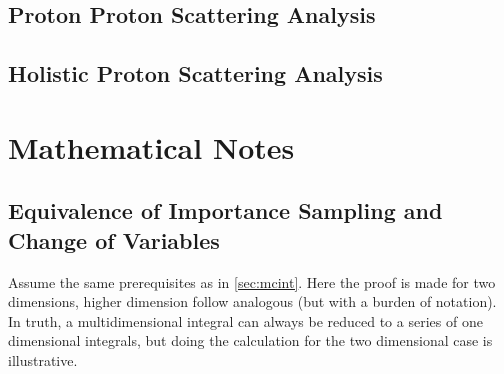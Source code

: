 \subsection{Proton Proton Scattering Analysis}%
\label{sec:ppanalysis}

\subsection{Holistic Proton Scattering Analysis}%
\label{sec:ppanalysisfull}

\section{Mathematical Notes}%
\label{sec:matap}

\subsection{Equivalence of Importance Sampling and Change of
  Variables}%
\label{sec:equap}

Assume the same prerequisites as in \cref{sec:mcint}. Here the proof
is made for two dimensions, higher dimension follow analogous (but
with a burden of notation). In truth, a multidimensional integral can
always be reduced to a series of one dimensional integrals, but doing
the calculation for the two dimensional case is illustrative.

